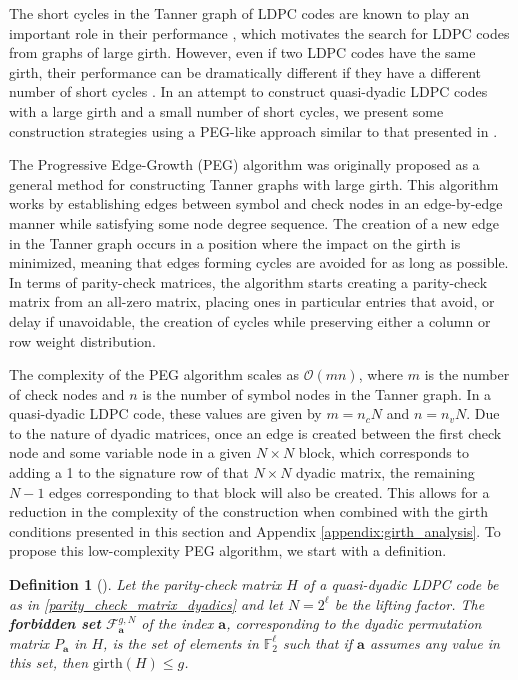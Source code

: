 \documentclass[11pt]{article}
\newtheorem{definition}[lemma]{Definition}
\theoremstyle{plain}
\theoremstyle{plain}
\theoremstyle{definition}
\numberwithin{theo}{section}
\newcommand{\ba}{{\mathbf a}}
\newcounter{rom}
\begin{document}
The short cycles in the Tanner graph of LDPC codes are known to play an important role in their performance \cite{mb01,hc06}, which motivates the search for LDPC codes from graphs of large girth. However, even if two LDPC codes have the same girth, their performance can be dramatically different if they have a different number of short cycles \cite{hc06}. In an attempt to construct quasi-dyadic LDPC codes with a large girth and a small number of short cycles, we present some construction strategies using a PEG-like approach similar to that presented in \cite{gfsm23b}. 

The Progressive Edge-Growth (PEG) algorithm \cite{hea05} was originally proposed as a general method for constructing Tanner graphs with large girth. This algorithm works by establishing edges between symbol and check nodes in an edge-by-edge manner while satisfying some node degree sequence. The creation of a new edge in the Tanner graph occurs in a position where the impact on the girth is minimized, meaning that edges forming cycles are avoided for as long as possible. In terms of parity-check matrices, the algorithm starts creating a parity-check matrix from an all-zero matrix, placing ones in particular entries that avoid, or delay if unavoidable, the creation of cycles while preserving either a column or row weight distribution. 

The complexity of the PEG algorithm scales as $\mathcal{O}(mn)$, where $m$ is the number of check nodes and $n$ is the number of symbol nodes in the Tanner graph. In a quasi-dyadic LDPC code, these values are given by $m=n_cN$ and $n=n_vN$. Due to the nature of dyadic matrices, once an edge is created between the first check node and some variable node in a given $N\times N$ block, which corresponds to adding a 1 to the signature row of that $N\times N$ dyadic matrix, the remaining $N-1$ edges corresponding to that block will also be created. This allows for a reduction in the complexity of the construction when combined with the girth conditions presented in this section and Appendix \ref{appendix:girth_analysis}. To propose this low-complexity PEG algorithm, we start with a definition.
\begin{definition}[]
\label{forbidden_set}
Let the parity-check matrix $H$ of a quasi-dyadic LDPC code be as in \eqref{parity_check_matrix_dyadics} and let $N=2^\ell$ be the lifting factor. The \textbf{forbidden set} $\mathcal{F}_{\ba}^{g,N}$ of the index $\ba$, corresponding to the dyadic permutation matrix $P_{\ba}$ in $H$, is the set of elements in $\mathbb{F}_2^\ell$ such that if $\ba$ assumes any value in this set, then $\text{girth}(H)\leq g$.
\end{definition}
\end{document}
